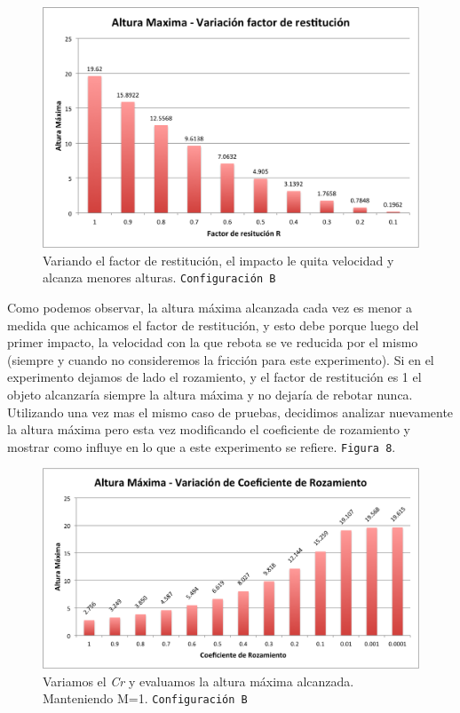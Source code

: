 \documentclass[a4paper]{article}
\begin{document}
\begin{figure}[H]
  \centering
  \includegraphics[scale=0.75]{graficos/7-AlturaMaxima-fr.png}
  \caption{Variando el factor de restitución, el impacto le quita velocidad y alcanza menores alturas. \texttt{Configuración B}}
\end{figure}

Como podemos observar, la altura máxima alcanzada cada vez es menor a medida que achicamos el factor de restitución, y esto debe porque luego del primer impacto, la velocidad con la que rebota se ve reducida por el mismo (siempre y cuando no consideremos la fricción para este experimento). Si en el experimento dejamos de lado el rozamiento, y el factor de restitución es 1 el objeto alcanzaría siempre la altura máxima y no dejaría de rebotar nunca.\\[1em]


Utilizando una vez mas el mismo caso de pruebas, decidimos analizar nuevamente la altura máxima pero esta vez modificando el coeficiente de rozamiento y mostrar como influye en lo que a este experimento se refiere. \texttt{Figura 8}.

\begin{figure}[H]
  \centering
  \includegraphics[scale=0.75]{graficos/8-AlturaMaxima-cr.png}
  \caption{Variamos el \textit{Cr} y evaluamos la altura máxima alcanzada. Manteniendo M=1. \texttt{Configuración B}}
\end{figure}
\end{document}
